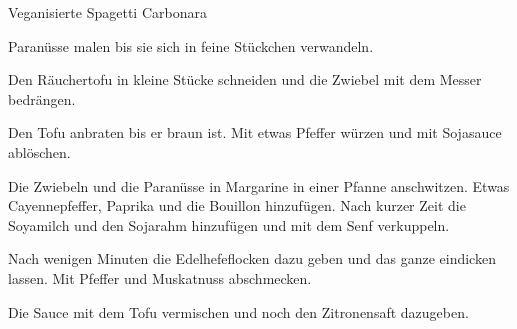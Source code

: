
\begin{recipe}[]{Veganisierte Spagetti Carbonara}{}{}



\step%
Paran\"usse malen bis sie sich in feine St\"uckchen verwandeln.

\step%
Den R\"auchertofu in kleine St\"ucke schneiden und die Zwiebel mit dem Messer
bedr\"angen.


\step%
Den Tofu anbraten bis er braun ist. Mit etwas Pfeffer w\"urzen und mit
Sojasauce abl\"oschen.

\step%
Die Zwiebeln und die Paran\"usse in Margarine in einer Pfanne anschwitzen.
Etwas Cayennepfeffer, Paprika und die Bouillon hinzuf\"ugen. Nach kurzer Zeit
die Soyamilch und den Sojarahm hinzuf\"ugen und mit dem Senf verkuppeln.

\step%
Nach wenigen Minuten die Edelhefeflocken dazu geben und das ganze eindicken lassen.
Mit Pfeffer und Muskatnuss abschmecken.

\step%
Die Sauce mit dem Tofu vermischen und noch den Zitronensaft dazugeben.


\end{recipe}
